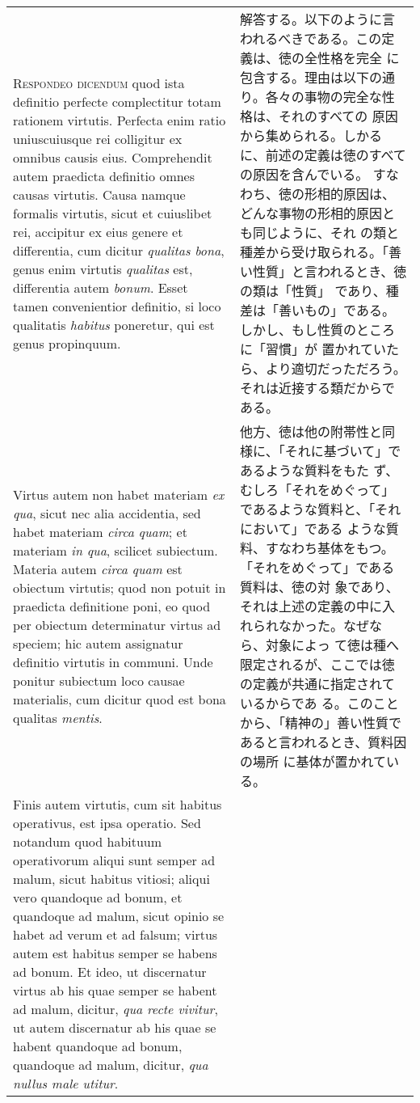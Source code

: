 \documentclass[10pt]{jsarticle}
\begin{document}
\begin{longtable}{p{21em}p{21em}}
{\scshape Respondeo dicendum} quod ista definitio perfecte
complectitur totam rationem virtutis. Perfecta enim ratio
uniuscuiusque rei colligitur ex omnibus causis eius. Comprehendit
autem praedicta definitio omnes causas virtutis. Causa namque formalis
virtutis, sicut et cuiuslibet rei, accipitur ex eius genere et
differentia, cum dicitur {\itshape qualitas bona}, genus enim virtutis
{\itshape qualitas} est, differentia autem {\itshape bonum}. Esset
tamen convenientior definitio, si loco qualitatis {\itshape habitus}
poneretur, qui est genus propinquum.

&

解答する。以下のように言われるべきである。この定義は、徳の全性格を完全
に包含する。理由は以下の通り。各々の事物の完全な性格は、それのすべての
原因から集められる。しかるに、前述の定義は徳のすべての原因を含んでいる。
すなわち、徳の形相的原因は、どんな事物の形相的原因とも同じように、それ
の類と種差から受け取られる。「善い性質」と言われるとき、徳の類は「性質」
であり、種差は「善いもの」である。しかし、もし性質のところに「習慣」が
置かれていたら、より適切だっただろう。それは近接する類だからである。

\\

Virtus autem non habet materiam {\itshape ex qua}, sicut nec alia
accidentia, sed habet materiam {\itshape circa quam}; et materiam
{\itshape in qua}, scilicet subiectum. Materia autem {\itshape circa
quam} est obiectum virtutis; quod non potuit in praedicta definitione
poni, eo quod per obiectum determinatur virtus ad speciem; hic autem
assignatur definitio virtutis in communi. Unde ponitur subiectum loco
causae materialis, cum dicitur quod est bona qualitas {\itshape
mentis}.

&

他方、徳は他の附帯性と同様に、「それに基づいて」であるような質料をもた
ず、むしろ「それをめぐって」であるような質料と、「それにおいて」である
ような質料、すなわち基体をもつ。「それをめぐって」である質料は、徳の対
象であり、それは上述の定義の中に入れられなかった。なぜなら、対象によっ
て徳は種へ限定されるが、ここでは徳の定義が共通に指定されているからであ
る。このことから、「精神の」善い性質であると言われるとき、質料因の場所
に基体が置かれている。

\\

Finis autem virtutis, cum sit habitus operativus, est ipsa
operatio. Sed notandum quod habituum operativorum aliqui sunt semper
ad malum, sicut habitus vitiosi; aliqui vero quandoque ad bonum, et
quandoque ad malum, sicut opinio se habet ad verum et ad falsum;
virtus autem est habitus semper se habens ad bonum. Et ideo, ut
discernatur virtus ab his quae semper se habent ad malum, dicitur,
{\itshape qua recte vivitur}, ut autem discernatur ab his quae se
habent quandoque ad bonum, quandoque ad malum, dicitur, {\itshape qua
nullus male utitur}.


\end{longtable}
\end{document}
